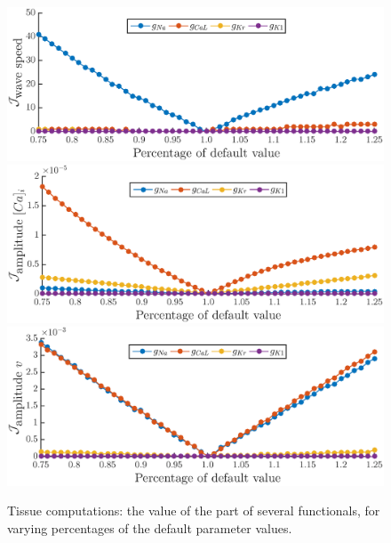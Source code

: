 \documentclass{article}
\begin{document}
\begin{figure}
\includegraphics[trim=0cm 0cm 0cm 0.5cm, clip=true, width=1\linewidth]{J_wave} 
\includegraphics[trim=0cm 0cm 0cm 0.5cm, clip=true, width=1\linewidth]{J_amplic}
\includegraphics[trim=0cm 0cm 0cm 0.5cm, clip=true, width=1\linewidth]{J_ampliv} 
    \caption{Tissue computations: the value of the part of several functionals, for varying percentages of the default parameter values.}
    \label{fig:9a}
\end{figure}
%
\end{document}
